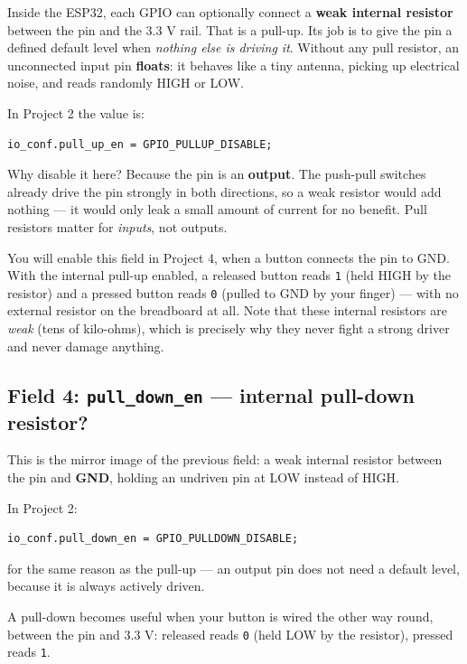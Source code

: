 \documentclass[11pt]{article}
\begin{document}
Inside the ESP32, each GPIO can optionally connect a \textbf{weak internal resistor} between the pin and the 3.3 V rail. That is a pull-up. Its job is to give the pin a defined default level when \emph{nothing else is driving it}. Without any pull resistor, an unconnected input pin \textbf{floats}: it behaves like a tiny antenna, picking up electrical noise, and reads randomly HIGH or LOW.

In Project 2 the value is:

\begin{verbatim}
io_conf.pull_up_en = GPIO_PULLUP_DISABLE;
\end{verbatim}

Why disable it here? Because the pin is an \textbf{output}. The push-pull switches already drive the pin strongly in both directions, so a weak resistor would add nothing --- it would only leak a small amount of current for no benefit. Pull resistors matter for \emph{inputs}, not outputs.

You will enable this field in Project 4, when a button connects the pin to GND. With the internal pull-up enabled, a released button reads \texttt{1} (held HIGH by the resistor) and a pressed button reads \texttt{0} (pulled to GND by your finger) --- with no external resistor on the breadboard at all. Note that these internal resistors are \emph{weak} (tens of kilo-ohms), which is precisely why they never fight a strong driver and never damage anything.

\subsection{Field 4: \texttt{pull\_down\_en} --- internal pull-down resistor?}

This is the mirror image of the previous field: a weak internal resistor between the pin and \textbf{GND}, holding an undriven pin at LOW instead of HIGH.

In Project 2:

\begin{verbatim}
io_conf.pull_down_en = GPIO_PULLDOWN_DISABLE;
\end{verbatim}

for the same reason as the pull-up --- an output pin does not need a default level, because it is always actively driven.

A pull-down becomes useful when your button is wired the other way round, between the pin and 3.3 V: released reads \texttt{0} (held LOW by the resistor), pressed reads \texttt{1}.
\end{document}
